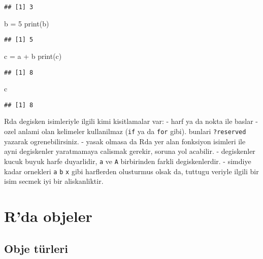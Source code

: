 \documentclass[
]{book}
\newenvironment{Shaded}{\begin{snugshade}}{\end{snugshade}}
\newcommand{\DecValTok}[1]{\textcolor[rgb]{0.00,0.00,0.81}{#1}}
\newcommand{\FunctionTok}[1]{\textcolor[rgb]{0.00,0.00,0.00}{#1}}
\newcommand{\NormalTok}[1]{#1}
\newcommand{\OtherTok}[1]{\textcolor[rgb]{0.56,0.35,0.01}{#1}}
\newcommand{\SpecialCharTok}[1]{\textcolor[rgb]{0.00,0.00,0.00}{#1}}
\begin{document}
\begin{verbatim}
## [1] 3
\end{verbatim}

\begin{Shaded}
\begin{Highlighting}[]
\NormalTok{b }\OtherTok{=} \DecValTok{5}
\FunctionTok{print}\NormalTok{(b)}
\end{Highlighting}
\end{Shaded}

\begin{verbatim}
## [1] 5
\end{verbatim}

\begin{Shaded}
\begin{Highlighting}[]
\NormalTok{c }\OtherTok{=}\NormalTok{ a }\SpecialCharTok{+}\NormalTok{ b}
\FunctionTok{print}\NormalTok{(c)}
\end{Highlighting}
\end{Shaded}

\begin{verbatim}
## [1] 8
\end{verbatim}

\begin{Shaded}
\begin{Highlighting}[]
\NormalTok{c}
\end{Highlighting}
\end{Shaded}

\begin{verbatim}
## [1] 8
\end{verbatim}

Rda degisken isimleriyle ilgili kimi kisitlamalar var:
- harf ya da nokta ile baslar
- ozel anlami olan kelimeler kullanilmaz (\texttt{if} ya da \texttt{for} gibi). bunlari \texttt{?reserved} yazarak ogrenebilirsiniz.
- yasak olmasa da Rda yer alan fonksiyon isimleri ile ayni degiskenler yaratmamaya calismak gerekir, soruna yol acabilir.
- degiskenler kucuk buyuk harfe duyarlidir, \texttt{a} ve \texttt{A} birbirinden farkli degiskenlerdir.
- simdiye kadar ornekleri \texttt{a} \texttt{b} \texttt{x} gibi harflerden olusturmus olsak da, tuttugu veriyle ilgili bir isim secmek iyi bir aliskanliktir.

\hypertarget{rda-objeler}{%
\section{R'da objeler}\label{rda-objeler}}

\hypertarget{obje-tuxfcrleri}{%
\subsection{Obje türleri}\label{obje-tuxfcrleri}}
\end{document}
